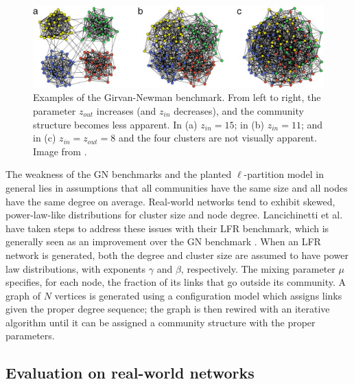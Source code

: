 \begin{figure}
\centering
\includegraphics{img/guimera2005_fig1_gm-benchmarks.jpeg}
\caption{Examples of the Girvan-Newman benchmark. From left to right,
the parameter \(z_{out}\) increases (and \(z_{in}\) decreases), and the
community structure becomes less apparent. In (a) \(z_{in}=15\); in (b)
\(z_{in}=11\); and in (c) \(z_{in} = z_{out} = 8\) and the four clusters
are not visually apparent. Image from
\autocite{guimera_functional_2005}.}\label{fig:gn_benchmarks}
\end{figure}

The weakness of the GN benchmarks and the planted \(\ell\)-partition
model in general lies in assumptions that all communities have the same
size and all nodes have the same degree on average. Real-world networks
tend to exhibit skewed, power-law-like distributions for cluster size
and node degree. Lancichinetti et al. have taken steps to address these
issues with their LFR benchmark, which is generally seen as an
improvement over the GN benchmark
\autocites{lancichinetti_benchmark_2008}{fortunato_community_2010}. When
an LFR network is generated, both the degree and cluster size are
assumed to have power law distributions, with exponents \(\gamma\) and
\(\beta\), respectively. The mixing parameter \(\mu\) specifies, for
each node, the fraction of its links that go outside its community. A
graph of \(N\) vertices is generated using a configuration model which
assigns links given the proper degree sequence; the graph is then
rewired with an iterative algorithm until it can be assigned a community
structure with the proper parameters.

\subsection{Evaluation on real-world
networks}\label{evaluation-on-real-world-networks}

